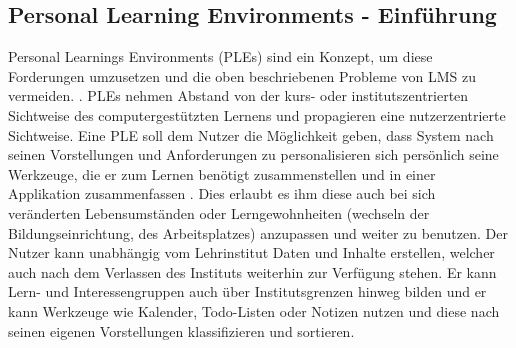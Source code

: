 \subsection{Personal Learning Environments - Einführung}\label{section:ple_intro}
Personal Learnings Environments (PLEs) sind ein Konzept, um diese Forderungen umzusetzen und die oben beschriebenen Probleme von LMS zu vermeiden. \cite{Attwell2007}. PLEs nehmen Abstand von der kurs- oder institutszentrierten Sichtweise des computergestützten Lernens und propagieren eine nutzerzentrierte Sichtweise. Eine PLE soll dem Nutzer die Möglichkeit geben, dass System nach seinen Vorstellungen und Anforderungen zu personalisieren sich persönlich seine Werkzeuge, die er zum Lernen benötigt zusammenstellen und in einer Applikation zusammenfassen \cite{VanHarmelen}. Dies erlaubt es ihm diese auch bei sich veränderten Lebensumständen oder Lerngewohnheiten (wechseln der Bildungseinrichtung, des Arbeitsplatzes) anzupassen und weiter zu benutzen. Der Nutzer kann unabhängig vom Lehrinstitut Daten und Inhalte erstellen, welcher auch nach dem Verlassen des Instituts weiterhin zur Verfügung stehen. Er kann Lern- und Interessengruppen auch über Institutsgrenzen hinweg bilden \cite{Schaffert2008a} und er kann Werkzeuge wie Kalender, Todo-Listen oder Notizen nutzen und diese nach seinen eigenen Vorstellungen klassifizieren und sortieren.